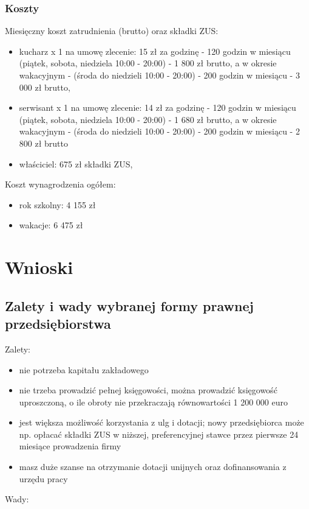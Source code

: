 \documentclass{sprawozdanie-agh}
\begin{document}
		\subsubsection{Koszty}
		Miesięczny koszt zatrudnienia (brutto) oraz składki ZUS:
		\begin{itemize}
			\item kucharz x 1 na umowę zlecenie: 15 zł za godzinę - 120 godzin w miesiącu (piątek, sobota, niedziela 10:00 - 20:00) - 1 800 zł brutto, a w okresie wakacyjnym - (środa do niedzieli 10:00 - 20:00) - 200 godzin w miesiącu - 3 000 zł brutto,
			\item serwisant x 1 na umowę zlecenie: 14 zł za godzinę - 120 godzin w miesiącu (piątek, sobota, niedziela 10:00 - 20:00) - 1 680 zł brutto, a w okresie wakacyjnym - (środa do niedzieli 10:00 - 20:00) - 200 godzin w miesiącu - 2 800 zł brutto
			\item właściciel: 675 zł składki ZUS,
		\end{itemize}
		Koszt wynagrodzenia ogółem:
		\begin{itemize}
			\item rok szkolny: 4 155 zł
			\item wakacje: 6 475 zł
		\end{itemize}

	\section{Wnioski} 

		\subsection{Zalety i wady wybranej formy prawnej przedsiębiorstwa}

		Zalety:

		\begin{itemize}
			\item nie potrzeba kapitału zakładowego
			\item nie trzeba prowadzić pełnej księgowości, można prowadzić księgowość uproszczoną, o ile obroty nie przekraczają równowartości 1 200 000 euro
			\item jest większa możliwość korzystania z ulg i dotacji; nowy przedsiębiorca może np. opłacać składki ZUS w niższej, preferencyjnej stawce przez pierwsze 24 miesiące prowadzenia firmy
			\item masz duże szanse na otrzymanie dotacji unijnych oraz dofinansowania z urzędu pracy
		\end{itemize}
		Wady:
\end{document}
